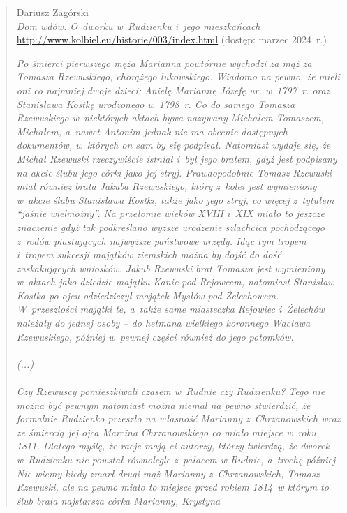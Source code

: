 \begin{quote}{Dariusz Zagórski \\ \null\hfill \emph{Dom wdów. O~dworku 
    w~Rudzienku i~jego mieszkańcach} \\ \null\hfill 
    \url{http://www.kolbiel.eu/historie/003/index.html} (dostęp: marzec 
    2024~r.)}

\textit{Po śmierci pierwszego męża Marianna powtórnie wychodzi za mąż za 
Tomasza Rzewuskiego, chorążego łukowskiego. Wiadomo na pewno, że mieli oni co 
najmniej dwoje dzieci: Anielę Mariannę Józefę ur. w~1797~r. oraz Stanisława 
Kostkę urodzonego w~1798~r. Co do samego Tomasza Rzewuskiego w~niektórych 
aktach bywa nazywany Michałem Tomaszem, Michałem, a~nawet Antonim jednak nie 
ma obecnie dostępnych dokumentów, w~których on sam by się podpisał. Natomiast 
wydaje się, że Michał Rzewuski rzeczywiście istniał i~był jego bratem, gdyż 
jest podpisany na akcie ślubu jego córki jako jej stryj. Prawdopodobnie 
Tomasz Rzewuski miał również brata Jakuba Rzewuskiego, który z~kolei jest 
wymieniony w~akcie ślubu Stanisława Kostki, także jako jego stryj, co więcej 
z~tytułem \enquote{jaśnie wielmożny}. Na przełomie wieków XVIII i~XIX miało 
to jeszcze znaczenie gdyż tak podkreślano wyższe urodzenie szlachcica 
pochodzącego z~rodów piastujących najwyższe państwowe urzędy. Idąc tym tropem 
i~tropem sukcesji majątków ziemskich można by dojść do dość zaskakujących 
wniosków. Jakub Rzewuski brat Tomasza jest wymieniony w~aktach jako dziedzic 
majątku Kanie pod Rejowcem, natomiast Stanisław Kostka po ojcu odziedziczył 
majątek Mysłów pod Żelechowem. W~przeszłości majątki te, a~także same 
miasteczka Rejowiec i~Żelechów należały do jednej osoby – do hetmana 
wielkiego koronnego Wacława Rzewuskiego, później w~pewnej części również do 
jego potomków.
\\
\\
(...)
\\
\\
Czy Rzewuscy pomieszkiwali czasem w~Rudnie czy Rudzienku? Tego nie można być 
pewnym natomiast można niemal na pewno stwierdzić, że formalnie Rudzienko 
przeszło na własność Marianny z~Chrzanowskich wraz ze śmiercią jej ojca 
Marcina Chrzanowskiego co miało miejsce w~roku 1811. Dlatego myślę, że racje 
mają ci autorzy, którzy twierdzą, że dworek w~Rudzienku nie powstał 
równolegle z~pałacem w Rudnie, a~trochę później. Nie wiemy kiedy zmarł drugi 
mąż Marianny z~Chrzanowskich, Tomasz Rzewuski, ale na pewno miało to miejsce 
przed rokiem 1814~w którym to ślub brała najstarsza córka Marianny, Krystyna 
}
\end{quote}
